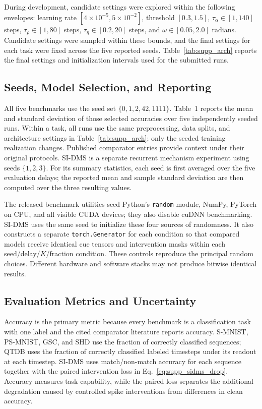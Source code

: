\documentclass[letterpaper]{article}
\begin{document}
During development, candidate settings were explored within the following envelopes: learning rate $[4\times10^{-5},5\times10^{-2}]$, threshold $[0.3,1.5]$, $\tau_\alpha\in[1,140]$ steps, $\tau_\rho\in[1,80]$ steps, $\tau_\eta\in[0.2,20]$ steps, and $\omega\in[0.05,2.0]$ radians. Candidate settings were sampled within these bounds, and the final settings for each task were fixed across the five reported seeds. Table~\ref{tab:supp_arch} reports the final settings and initialization intervals used for the submitted runs.

\subsection{Seeds, Model Selection, and Reporting}
\label{supp:sec:reporting}

All five benchmarks use the seed set $\{0,1,2,42,1111\}$. Table~1 reports the mean and standard deviation of those selected accuracies over five independently seeded runs. Within a task, all runs use the same preprocessing, data splits, and architecture settings in Table~\ref{tab:supp_arch}; only the seeded training realization changes. Published comparator entries provide context under their original protocols. SI-DMS is a separate recurrent mechanism experiment using seeds $\{1,2,3\}$. For its summary statistics, each seed is first averaged over the five evaluation delays; the reported mean and sample standard deviation are then computed over the three resulting values.

The released benchmark utilities seed Python's \texttt{random} module, NumPy, PyTorch on CPU, and all visible CUDA devices; they also disable cuDNN benchmarking. SI-DMS uses the same seed to initialize these four sources of randomness. It also constructs a separate \texttt{torch.Generator} for each condition so that compared models receive identical cue tensors and intervention masks within each seed/delay/$K$/fraction condition. These controls reproduce the principal random choices. Different hardware and software stacks may not produce bitwise identical results.

\subsection{Evaluation Metrics and Uncertainty}
\label{supp:sec:metrics}

Accuracy is the primary metric because every benchmark is a classification task with one label and the cited comparator literature reports accuracy. S-MNIST, PS-MNIST, GSC, and SHD use the fraction of correctly classified sequences; QTDB uses the fraction of correctly classified labeled timesteps under its readout at each timestep. SI-DMS uses match/non-match accuracy for each sequence together with the paired intervention loss in Eq.~\eqref{eq:supp_sidms_drop}. Accuracy measures task capability, while the paired loss separates the additional degradation caused by controlled spike interventions from differences in clean accuracy.
\end{document}
